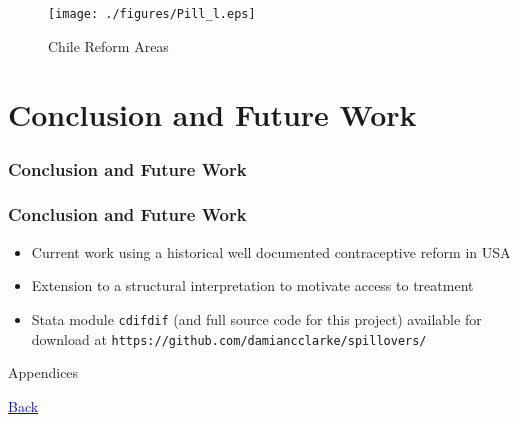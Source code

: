 \documentclass[10pt,letterpaper,subeqn]{beamer}
\begin{document}
\begin{frame}[label=ChileMap]
\begin{figure}
\begin{center}
\caption{Chile Reform Areas}
\hspace{-16mm}\texttt{[image: ./figures/Pill\_l.eps]}
\end{center}
\end{figure}
\end{frame}


\section{Conclusion and Future Work}
\begin{frame}[label=concl]
  \frametitle{Conclusion and Future Work}

\end{frame}


\begin{frame}[label=future]
  \frametitle{Conclusion and Future Work}
\begin{itemize}
\item Current work using a historical well documented contraceptive reform in USA
\item Extension to a structural interpretation to motivate access to treatment
\item Stata module \texttt{cdifdif} (and full source code for this project) 
  available for download at \texttt{https://github.com/damiancclarke/spillovers/}
\end{itemize}
\end{frame}


\begin{frame}
{\Large Appendices}
\end{frame}

\begin{frame}[label=ChileDesc]

\hyperlink{empirA}{\textcolor{blue}{Back}}
\end{frame}

\begin{frame}[label=MexicoDesc]

\end{frame}
\end{document}
